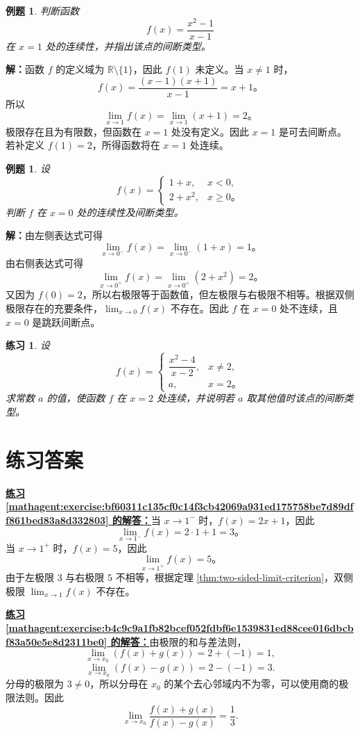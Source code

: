 \documentclass[UTF8,fontset=fandol,11pt]{ctexart}
\newtheorem{example}[definition]{例题}
\newtheorem{exercise}[definition]{练习}
\begin{document}
\begin{example}
判断函数
\[
f(x)=\frac{x^2-1}{x-1}
\]
在 $x=1$ 处的连续性，并指出该点的间断类型。
\end{example}
\par\noindent\textbf{解：}函数 $f$ 的定义域为 $\mathbb{R}\setminus\{1\}$，因此 $f(1)$ 未定义。当 $x\neq1$ 时，
\[
f(x)=\frac{(x-1)(x+1)}{x-1}=x+1\text{。}
\]
所以
\[
\lim_{x\to1}f(x)=\lim_{x\to1}(x+1)=2\text{。}
\]
极限存在且为有限数，但函数在 $x=1$ 处没有定义。因此 $x=1$ 是可去间断点。若补定义 $f(1)=2$，所得函数将在 $x=1$ 处连续。\par
\begin{example}
设
\[
f(x)=
\begin{cases}
1+x,&x<0,\\
2+x^2,&x\geq0\text{。}
\end{cases}
\]
判断 $f$ 在 $x=0$ 处的连续性及间断类型。
\end{example}
\par\noindent\textbf{解：}由左侧表达式可得
\[
\lim_{x\to0^-}f(x)=\lim_{x\to0^-}(1+x)=1\text{。}
\]
由右侧表达式可得
\[
\lim_{x\to0^+}f(x)=\lim_{x\to0^+}(2+x^2)=2\text{。}
\]
又因为 $f(0)=2$，所以右极限等于函数值，但左极限与右极限不相等。根据双侧极限存在的充要条件，$\lim_{x\to0}f(x)$ 不存在。因此 $f$ 在 $x=0$ 处不连续，且 $x=0$ 是跳跃间断点。\par
\begin{exercise}
\label{mathagent:exercise:89dc01d13bdd47d62d3f0c96d9d7bd4201cee6446e15a7269f32977f2b24d58c}
设
\[
f(x)=
\begin{cases}
\dfrac{x^2-4}{x-2},&x\neq2,\\
a,&x=2\text{。}
\end{cases}
\]
求常数 $a$ 的值，使函数 $f$ 在 $x=2$ 处连续，并说明若 $a$ 取其他值时该点的间断类型。
\end{exercise}
\section*{练习答案}
\par\noindent\textbf{\hyperref[mathagent:exercise:bf60311c135cf0c14f3cb42069a931ed175758be7d89dff861bed83a8d332803]{练习 \ref*{mathagent:exercise:bf60311c135cf0c14f3cb42069a931ed175758be7d89dff861bed83a8d332803} 的解答：}}当 $x\to1^-$ 时，$f(x)=2x+1$，因此
\[
\lim_{x\to1^-}f(x)=2\cdot1+1=3\text{。}
\]
当 $x\to1^+$ 时，$f(x)=5$，因此
\[
\lim_{x\to1^+}f(x)=5\text{。}
\]
由于左极限 $3$ 与右极限 $5$ 不相等，根据定理 \ref{thm:two-sided-limit-criterion}，双侧极限 $\lim_{x\to1}f(x)$ 不存在。\par
\par\noindent\textbf{\hyperref[mathagent:exercise:b4c9c9a1fb82bcef052fdbf6e1539831ed88cee016dbcbf83a50e5e8d2311be0]{练习 \ref*{mathagent:exercise:b4c9c9a1fb82bcef052fdbf6e1539831ed88cee016dbcbf83a50e5e8d2311be0} 的解答：}}由极限的和与差法则，
\[
\lim_{x\to x_0}(f(x)+g(x))=2+(-1)=1,
\]
\[
\lim_{x\to x_0}(f(x)-g(x))=2-(-1)=3.
\]
分母的极限为 $3\neq0$，所以分母在 $x_0$ 的某个去心邻域内不为零，可以使用商的极限法则。因此
\[
\lim_{x\to x_0}\frac{f(x)+g(x)}{f(x)-g(x)}=\frac{1}{3}.
\]
\end{document}
